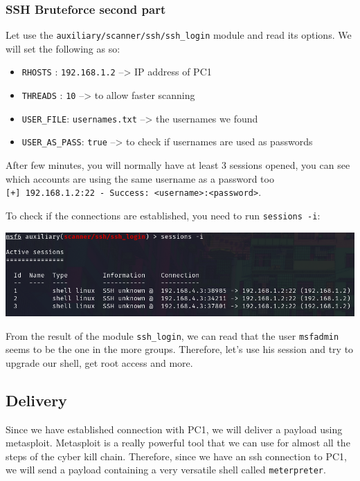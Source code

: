 \documentclass[a4paper,11pt,singlespacing]{article}
\providecommand{\tightlist}{%
  \setlength{\itemsep}{0pt}\setlength{\parskip}{0pt}}
\begin{document}
\subsubsection{SSH Bruteforce second
part}\label{ssh-bruteforce-second-part}

Let use the \texttt{auxiliary/scanner/ssh/ssh\_login} module and read
its options. We will set the following as so:

\begin{itemize}
\tightlist
\item
  \texttt{RHOSTS} : \texttt{192.168.1.2} --\textgreater{} IP address of
  PC1
\item
  \texttt{THREADS} : \texttt{10} --\textgreater{} to allow faster
  scanning
\item
  \texttt{USER\_FILE}: \texttt{usernames.txt} --\textgreater{} the
  usernames we found
\item
  \texttt{USER\_AS\_PASS}: \texttt{true} --\textgreater{} to check if
  usernames are used as passwords
\end{itemize}

After few minutes, you will normally have at least 3 sessions opened,
you can see which accounts are using the same username as a password too
\texttt{{[}+{]}\ 192.168.1.2:22\ -\ Success:\ \textquotesingle{}\textless{}username\textgreater{}:\textless{}password\textgreater{}\textquotesingle{}}.

To check if the connections are established, you need to run
\texttt{sessions\ -i}:

\includegraphics{./Images/Image03.png}

From the result of the module \texttt{ssh\_login}, we can read that the
user \texttt{msfadmin} seems to be the one in the more groups.
Therefore, let's use his session and try to upgrade our shell, get root
access and more.

\subsection{Delivery}\label{delivery}

Since we have established connection with PC1, we will deliver a payload
using metasploit. Metasploit is a really powerful tool that we can use
for almost all the steps of the cyber kill chain. Therefore, since we
have an ssh connection to PC1, we will send a payload containing a very
versatile shell called \texttt{meterpreter}.
\end{document}
